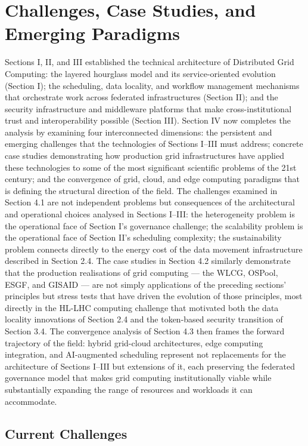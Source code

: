 \documentclass[12pt,a4paper]{report}
\begin{document}
\section*{Challenges, Case Studies, and Emerging Paradigms}
Sections I, II, and III established the technical architecture of Distributed Grid Computing: the layered hourglass model and its service-oriented 
evolution (Section I); the scheduling, data locality, and workflow management mechanisms that orchestrate work across federated infrastructures 
(Section II); and the security infrastructure and middleware platforms that make cross-institutional trust and interoperability possible (Section III).
 Section IV now completes the analysis by examining four interconnected dimensions: the persistent and emerging challenges that the technologies of 
 Sections I–III must address; concrete case studies demonstrating how production grid infrastructures have applied these technologies to some of the 
 most significant scientific problems of the 21st century; and the convergence of grid, cloud, and edge computing paradigms that is defining the 
 structural direction of the field. The challenges examined in Section 4.1 are not independent problems but consequences of the architectural and 
 operational choices analysed in Sections I–III: the heterogeneity problem is the operational face of Section I’s governance challenge; the 
 scalability problem is the operational face of Section II’s scheduling complexity; the sustainability problem connects directly to the energy 
 cost of the data movement infrastructure described in Section 2.4. The case studies in Section 4.2 similarly demonstrate that the production 
 realisations of grid computing — the WLCG, OSPool, ESGF, and GISAID — are not simply applications of the preceding sections’ principles but 
 stress tests that have driven the evolution of those principles, most directly in the HL-LHC computing challenge that motivated both the data 
 locality innovations of Section 2.4 and the token-based security transition of Section 3.4. The convergence analysis of Section 4.3 then frames 
 the forward trajectory of the field: hybrid grid-cloud architectures, edge computing integration, and AI-augmented scheduling represent not 
 replacements for the architecture of Sections I–III but extensions of it, each preserving the federated governance model that makes grid computing 
 institutionally viable while substantially expanding the range of resources and workloads it can accommodate.

\subsection*{Current Challenges}
\end{document}
